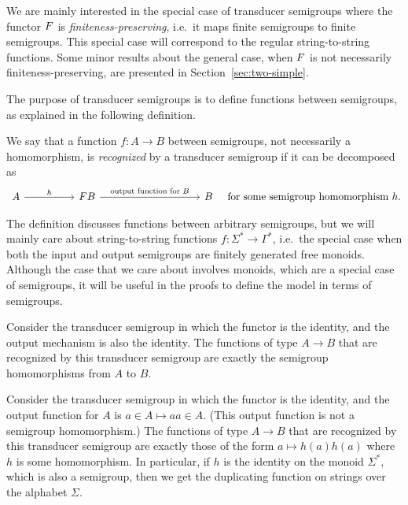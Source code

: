 We are mainly interested in the special case of transducer semigroups where the functor $\functor$ is \emph{finiteness-preserving}, i.e.~it maps finite semigroups to finite semigroups. This special case will correspond to the regular string-to-string functions. Some minor results about the general case, when $\functor$ is not necessarily finiteness-preserving, are presented in Section~\ref{sec:two-simple}.

The purpose of transducer semigroups is to define functions between semigroups, as explained in the following definition. 
\begin{definition}
 We say that a function $f : A \to B$ between semigroups, not necessarily a homomorphism, is \emph{recognized} by a transducer semigroup if it can be decomposed as
 \[
 \begin{tikzcd}
 [column sep=1.7cm]
 A 
 \ar[r,"h"]
 &
 \functor B
 \ar[rr,"\text{output function for $B$}"]
 &&
 B
 \end{tikzcd}
 \quad
 \text{for some semigroup homomorphism}\ h.
 \]
\end{definition}


The definition discusses functions between arbitrary semigroups, but we will mainly care about string-to-string functions $f : \Sigma^* \to \Gamma^*$, i.e.~the special case when both the input and output semigroups are finitely generated free monoids. Although the case that we care about involves monoids, which are a special case of semigroups, it will be useful in the proofs to define the model in terms of semigroups.


\begin{example}
 Consider the transducer semigroup in which the functor is the identity, and the output mechanism is also the identity. The functions of type $A \to B$ that are recognized by this transducer semigroup are exactly the semigroup homomorphisms from $A$ to $B$.
\end{example}

\begin{example}\label{ex:duplicator}
 Consider the transducer semigroup in which the functor is the identity, and the output function for $A$ is $a \in A \mapsto aa \in A$. (This output function is not a semigroup homomorphism.)
 The functions of type $A \to B$ that are recognized by this transducer semigroup are exactly those of the form $a \mapsto h(a)h(a)$ where $h$ is some homomorphism. In particular, if $h$ is the identity on the monoid $\Sigma^*$, which is also a semigroup, then we get the duplicating function on strings over the alphabet $\Sigma$.
\end{example}



